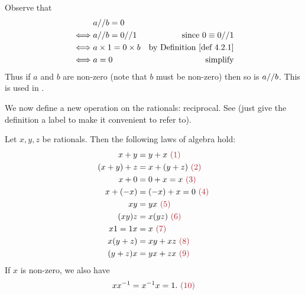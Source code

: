 \begin{additional corollary} \label{ac 4.2.2}
Observe that
\begin{align*}
         & a \D b = 0 \\
    \iff & a \D b = 0 \D 1 & \text{since \(0 \equiv 0 \D 1\)} \\
    \iff & a \X 1 = 0 \X b & \text{by \DEF{4.2.1}} \\
    \iff & a = 0 & \text{simplify}
\end{align*}
Thus if \(a\) and \(b\) are non-zero (note that \(b\) must be non-zero) then so is \(a \text{//} b\). This is used in .
\end{additional corollary}

We now define a new operation on the rationals: reciprocal. See  (just give the definition a label to make it convenient to refer to).

\begin{proposition}  \label{prop 4.2.4}
Let \(x, y, z\) be rationals.
Then the following laws of algebra hold:
\begin{align*}
          x + y & = y + x \MAROON{\ (1)} \\
    (x + y) + z & = x + (y + z) \MAROON{\ (2)} \\
          x + 0 & = 0 + x = x \MAROON{\ (3)} \\
       x + (-x) & = (-x) + x = 0 \MAROON{\ (4)} \\
             xy & = yx \MAROON{\ (5)} \\
          (xy)z & = x(yz) \MAROON{\ (6)} \\
        x1 = 1x & = x \MAROON{\ (7)} \\
       x(y + z) & = xy + xz \MAROON{\ (8)} \\
       (y + z)x & = yx + zx \MAROON{\ (9)}
\end{align*}
If \(x\) is non-zero, we also have
\begin{align*}
    xx^{-1} = x^{-1}x = 1. \MAROON{\ (10)}
\end{align*}
\end{proposition}

